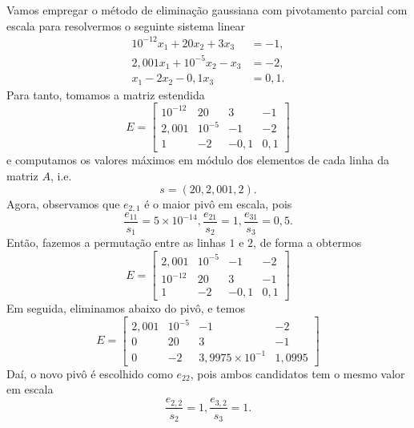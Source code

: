 \begin{ex}\label{ex:egauss_pivo}
  Vamos empregar o método de eliminação gaussiana com pivotamento parcial com escala para resolvermos o seguinte sistema linear
  \begin{align}
    10^{-12}x_1 + 20x_2 + 3x_3 &= -1,\\
    2,001x_1 + 10^{-5}x_2 - x_3 &= -2,\\
    x_1 - 2x_2 - 0,1x_3 &= 0,1.
  \end{align}
  Para tanto, tomamos a matriz estendida
  \begin{equation}
    E =
    \begin{bmatrix}
      10^{-12} & 20 & 3 & -1\\
      2,001 & 10^{-5} & -1 & -2\\
      1 & -2 & -0,1 & 0,1
    \end{bmatrix}
  \end{equation}
  e computamos os valores máximos em módulo dos elementos de cada linha da matriz $A$, i.e.
  \begin{equation}
    s = (20, 2,001, 2).
  \end{equation}
  Agora, observamos que $e_{2,1}$ é o maior pivô em escala, pois
  \begin{equation}
    \frac{e_{11}}{s_1} = 5\times 10^{-14}, \frac{e_{21}}{s_2} = 1, \frac{e_{31}}{s_3}=0,5.
  \end{equation}
  Então, fazemos a permutação entre as linhas $1$ e $2$, de forma a obtermos
  \begin{equation}
    E =
    \begin{bmatrix}
      2,001 & 10^{-5} & -1 & -2\\
      10^{-12} & 20 & 3 & -1\\
      1 & -2 & -0,1 & 0,1
    \end{bmatrix}    
  \end{equation}
  Em seguida, eliminamos abaixo do pivô, e temos
  \begin{equation}
    E =
    \begin{bmatrix}
      2,001 & 10^{-5} & -1 & -2\\
      0 & 20 & 3 & -1\\
      0 & -2 & 3,9975\times 10^{-1} & 1,0995
    \end{bmatrix}
  \end{equation}
  Daí, o novo pivô é escolhido como $e_{22}$, pois ambos candidatos tem o mesmo valor em escala
  \begin{equation}
    \frac{e_{2,2}}{s_2} = 1, \frac{e_{3,2}}{s_3} = 1.

\end{equation}
\end{ex}

